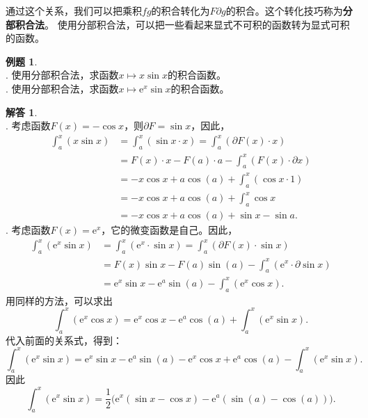\documentclass[12pt,UTF8]{ctexbook}
\theoremstyle{definition}
\newtheorem{et}{例题}[section]
\newtheorem*{so}{解答}
\theoremstyle{plain}
\begin{document}
通过这个关系，我们可以把乘积$fg$的积合转化为$F\partial g$的积合。这个转化技巧称为\textbf{分部积合法}。
使用分部积合法，可以把一些看起来显式不可积的函数转为显式可积的函数。

\begin{et}
    \mbox{} \\
    . 使用分部积合法，求函数$x\mapsto x \sin{x}$的积合函数。\\
    . 使用分部积合法，求函数$x\mapsto \mathrm{e}^x \sin{x}$的积合函数。\\
\end{et}

\begin{so}    
    \mbox{} \\
    . 考虑函数$F(x) = -\cos{x}$，则$\partial F = \sin{x}$，因此，
    \begin{align*}
        \int_a^x (x\sin{x}) &= \int_a^x (\sin{x}\cdot x) = \int_a^x (\partial F(x) \cdot x) \\
        &= F(x)\cdot x - F(a)\cdot a - \int_a^x (F(x) \cdot \partial x) \\
        &= -x\cos{x} + a\cos(a) + \int_a^x (\cos{x} \cdot 1) \\
        &= -x\cos{x} + a\cos(a) + \int_a^x \cos{x} \\
        &= -x\cos{x} + a\cos(a) + \sin{x} - \sin{a}.
    \end{align*}
    . 考虑函数$F(x) = \mathrm{e}^x$，它的微变函数是自己。因此，
    \begin{align*}
        \int_a^x \left(\mathrm{e}^{x} \sin{x}\right) &= \int_a^x \left(\mathrm{e}^x\cdot \sin{x}\right) = \int_a^x \left(\partial F(x) \cdot \sin{x}\right) \\
        &= F(x)\sin{x} - F(a)\sin(a) - \int_a^x \left(\mathrm{e}^{x} \cdot \partial \sin{x}\right) \\
        &= \mathrm{e}^x\sin{x} - \mathrm{e}^a\sin(a) - \int_a^x \left(\mathrm{e}^x \cos{x}\right) .
    \end{align*}
    用同样的方法，可以求出
    $$  \int_a^x \left(\mathrm{e}^x \cos{x}\right) = \mathrm{e}^x\cos{x} - \mathrm{e}^a\cos(a) + \int_a^x \left(\mathrm{e}^{x} \sin{x}\right). $$
    代入前面的关系式，得到：
    $$ \int_a^x \left(\mathrm{e}^{x} \sin{x}\right) = \mathrm{e}^x\sin{x} - \mathrm{e}^a\sin(a) - \mathrm{e}^x\cos{x} + \mathrm{e}^a\cos(a) - \int_a^x \left(\mathrm{e}^{x} \sin{x}\right). $$
    因此
    $$ \int_a^x \left(\mathrm{e}^{x} \sin{x}\right) = \frac{1}{2}\big(\mathrm{e}^x(\sin{x} - \cos{x}) - \mathrm{e}^a(\sin(a) - \cos(a))\big).$$
\end{so}
\end{document}
